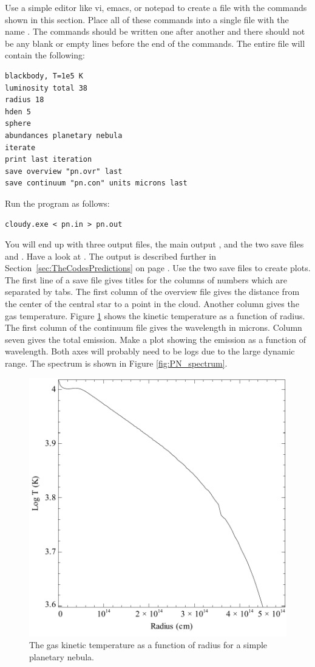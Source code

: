 \documentclass[12pt,twoside]{article}
\begin{document}
Use a simple editor like vi, emacs, or notepad to create a file with
the commands shown in this section.
Place all of these commands
into a single file with the name .
The commands should be written
one after another and there should not be any blank or empty lines before
the end of the commands.
The entire file will contain the following:
\small
\begin{verbatim}
blackbody, T=1e5 K
luminosity total 38
radius 18
hden 5
sphere
abundances planetary nebula
iterate
print last iteration
save overview "pn.ovr" last
save continuum "pn.con" units microns last
\end{verbatim}
\normalsize
Run the program as follows:
\small
\begin{verbatim}
cloudy.exe < pn.in > pn.out
\end{verbatim}
\normalsize
You will end up with three output files,
the main output , and the
two save files  and .
Have a look at .  The output is
described further in Section~\ref{sec:TheCodesPredictions}
on page \pageref{sec:TheCodesPredictions}.
Use the two save
files to create plots.  The first line of
a save file gives titles for
the columns of numbers which are separated by tabs.
The first column of the overview file gives the distance
from the center of the central star to a point in the cloud.
Another column gives the gas temperature.
Figure \ref{fig:PN_temperature} shows the kinetic temperature as a function of radius.
The first column of the continuum file gives the wavelength in microns.
Column seven gives the total emission.  Make a plot showing the emission
as a function of wavelength.  Both axes will probably need to be logs due
to the large dynamic range.
The spectrum is shown in Figure \ref{fig:PN_spectrum}.

\begin{figure}
\begin{center}
\includegraphics[clip=on,width=0.8\columnwidth,height=0.8\textheight,keepaspectratio]{PN_temperature}
\end{center}
\caption{The gas kinetic temperature as a function of radius for a simple planetary nebula.}
\label{fig:PN_temperature}
\end{figure}
\end{document}
